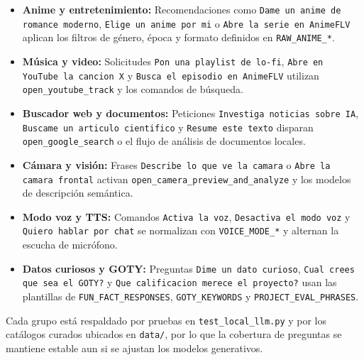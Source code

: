 \documentclass[a4paper,12pt]{article}
\begin{document}
\begin{itemize}
    \item \textbf{Anime y entretenimiento:} Recomendaciones como \texttt{Dame un anime de romance moderno}, \texttt{Elige un anime por mi} o \texttt{Abre la serie en AnimeFLV} aplican los filtros de g\'enero, \'epoca y formato definidos en \texttt{RAW\_ANIME\_*}.
    \item \textbf{M\'usica y video:} Solicitudes \texttt{Pon una playlist de lo-fi}, \texttt{Abre en YouTube la cancion X} y \texttt{Busca el episodio en AnimeFLV} utilizan \texttt{open\_youtube\_track} y los comandos de b\'usqueda.
    \item \textbf{Buscador web y documentos:} Peticiones \texttt{Investiga noticias sobre IA}, \texttt{Buscame un articulo cientifico} y \texttt{Resume este texto} disparan \texttt{open\_google\_search} o el flujo de an\'alisis de documentos locales.
    \item \textbf{C\'amara y visi\'on:} Frases \texttt{Describe lo que ve la camara} o \texttt{Abre la camara frontal} activan \texttt{open\_camera\_preview\_and\_analyze} y los modelos de descripci\'on sem\'antica.
    \item \textbf{Modo voz y TTS:} Comandos \texttt{Activa la voz}, \texttt{Desactiva el modo voz} y \texttt{Quiero hablar por chat} se normalizan con \texttt{VOICE\_MODE\_*} y alternan la escucha de micr\'ofono.
    \item \textbf{Datos curiosos y GOTY:} Preguntas \texttt{Dime un dato curioso}, \texttt{Cual crees que sea el GOTY?} y \texttt{Que calificacion merece el proyecto?} usan las plantillas de \texttt{FUN\_FACT\_RESPONSES}, \texttt{GOTY\_KEYWORDS} y \texttt{PROJECT\_EVAL\_PHRASES}.
\end{itemize}

Cada grupo est\'a respaldado por pruebas en \texttt{test\_local\_llm.py} y por los cat\'alogos curados ubicados en \texttt{data/}, por lo que la cobertura de preguntas se mantiene estable aun si se ajustan los modelos generativos.
\end{document}
